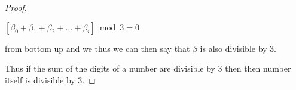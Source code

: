 \documentclass[12pt, fullpage]{article}
\begin{document}
\begin{proof}
\begin{center}
$[ \beta_0+ \beta_1 + \beta_2 + ... + \beta_i ]\bmod 3 = 0$
\end{center} from bottom up and we thus we can then say that $\beta$ is also divisible by 3.
\begin{comment} 
\begin{align*}
( \beta_0+ \beta_1 + \beta_2 + ... + \beta_i )\bmod 3 &= 0\\
( (\beta_0) \bmod 3 + (\beta_1)\bmod 3+(\beta_2)\bmod 3 + ... + (\beta_i)\bmod 3 )\bmod 3 &= \\
( ((\beta_0)\bmod 3*1) \bmod 3 + ((\beta_1)\bmod 3 * 1) \bmod 3 +((\beta_2)\bmod 3 * 1)\bmod 3)+&\\ \bmod 3 + ... + ((\beta_i)\bmod 3 * 1) \bmod 3 )\bmod 3 &=\\
( ((\beta_0)\bmod 3*(10^0)\bmod3) \bmod 3 + ((\beta_1)\bmod 3 * (10^1)\bmod 3) \bmod 3 & +\\((\beta_2)\bmod 3 * (10^2))\bmod 3) \bmod 3 + ... + ((\beta_i)\bmod 3 * (10^i)\bmod 3) \bmod 3 )\bmod 3 &= \\
( (\beta_0*10^0) \bmod 3 + (\beta_1 * 10^1) \bmod 3 + (\beta_2 * 10^2) \bmod 3 + ... + (\beta_i * 10^i) \bmod 3 )\bmod 3 &=\\
( \beta_0*10^0 + \beta_1 * 10^1 + \beta_2 * 10^2 + ... + \beta_i * 10^i ) \bmod 3 &= 0\\
( \beta) \bmod 3 &= 0
\end{align*}
\end{comment}

Thus if the sum of the digits of a number are divisible by 3 then then number itself is divisible by 3.

\end{proof}
\end{document}
